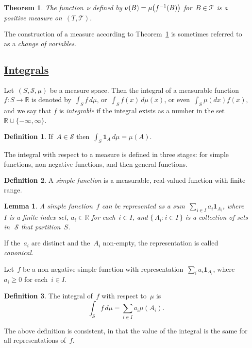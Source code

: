 \documentclass[11pt,a4paper]{article}
\newcommand\mb[1]{\mathbb{#1}}                   %
\newcommand\mc[1]{\mathcal{#1}}                  %
\DeclarePairedDelimiter\lr{\lparen}{\rparen}     %
\newtheorem{lem}{Lemma}
\newtheorem{thm}{Theorem}
\theoremstyle{definition}
\newtheorem{defn}{Definition}
\begin{document}
\begin{thm}\label{thm:measures change}
The function~$\nu$ defined by $\nu(B) = \mu\lr*{f^{-1}(B)}$ for~$B \in \mc{T}$
is a positive measure on~$(T,\mc{T})$.
\end{thm}
The construction of a measure according to Theorem~\ref{thm:measures change} is
sometimes referred to as a \emph{change of variables}.

\subsection %
  {\href{http://www.randomservices.org/random/dist/Integral.html}
  {Integrals}}

Let~$(S,\mc{S},\mu)$ be a measure space. Then the integral of a measurable
function~$f\colon S \to \mb{R}$ is denoted by~$\int_S f\,d\mu$, or~$\int_S
f(x)\,d\mu(x)$, or even~$\int_S \mu(dx)f(x)$, and we say that $f$ is
\emph{integrable} if the integral exists as a number in the set~$\mb{R} \cup
\{-\infty,\infty\}$.
\begin{defn}
If~$A \in \mc{S}$ then~$\int_S \symbf{1}_A\,d\mu = \mu(A)$.
\end{defn}

The integral with respect to a measure is defined in three stages: for simple
functions, non-negative functions, and then general functions.
\begin{defn}
A \emph{simple function} is a measurable, real-valued function with finite
range.
\end{defn}

\begin{lem}
A simple function~$f$ can be represented as a sum~$\sum_{i\in I}
a_i\symbf{1}_{A_i}$, where~$I$ is a finite index set, $a_i \in \mb{R}$ for
each~$i \in I$, and $\{\, A_i : i \in I \,\}$ is a collection of sets
in~$\,\mc{S}$ that partition~$S$.
\end{lem}
If the~$a_i$ are distinct and the~$A_i$ non-empty, the representation is called
\emph{canonical}.

Let~$f$ be a non-negative simple function with representation~$\sum_i
a_i\symbf{1}_{A_i}$, where~$a_i \ge 0$ for each~$i \in I$.
\begin{defn}
The integral of~$f$ with respect to~$\mu$ is
\[ \int_S f\,d\mu = \sum_{i\in I} a_i\mu(A_i). \]
\end{defn}
The above definition is consistent, in that the value of the integral is the
same for all representations of~$f$.
\end{document}
